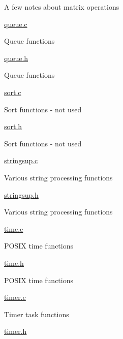 \begin{DoxyItemize}
\begin{DoxyItemize}
\begin{DoxyItemize}
\item A few notes about matrix operations
\end{DoxyItemize}
\item \hyperlink{queue_8c}{queue.\+c}
\begin{DoxyItemize}
\item Queue functions
\end{DoxyItemize}
\item \hyperlink{queue_8h}{queue.\+h}
\begin{DoxyItemize}
\item Queue functions
\end{DoxyItemize}
\item \hyperlink{sort_8c}{sort.\+c}
\begin{DoxyItemize}
\item Sort functions -\/ not used
\end{DoxyItemize}
\item \hyperlink{sort_8h}{sort.\+h}
\begin{DoxyItemize}
\item Sort functions -\/ not used
\end{DoxyItemize}
\item \hyperlink{stringsup_8c}{stringsup.\+c}
\begin{DoxyItemize}
\item Various string processing functions
\end{DoxyItemize}
\item \hyperlink{stringsup_8h}{stringsup.\+h}
\begin{DoxyItemize}
\item Various string processing functions
\end{DoxyItemize}
\item \hyperlink{time_8c}{time.\+c}
\begin{DoxyItemize}
\item P\+O\+S\+IX time functions
\end{DoxyItemize}
\item \hyperlink{time_8h}{time.\+h}
\begin{DoxyItemize}
\item P\+O\+S\+IX time functions
\end{DoxyItemize}
\item \hyperlink{timer_8c}{timer.\+c}
\begin{DoxyItemize}
\item Timer task functions
\end{DoxyItemize}
\item \hyperlink{timer_8h}{timer.\+h}

\end{DoxyItemize}
\end{DoxyItemize}

